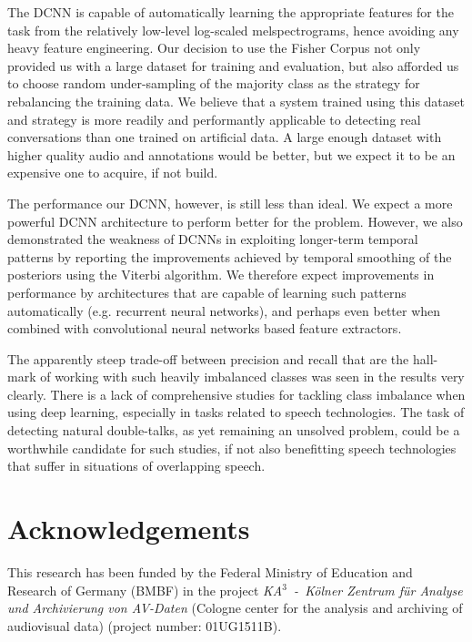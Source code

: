 \documentclass[a4paper]{article}
\begin{document}
The DCNN is capable of automatically learning the appropriate features for the task from the relatively low-level log-scaled melspectrograms, hence avoiding any heavy feature engineering.
Our decision to use the Fisher Corpus not only provided us with a large dataset for training and evaluation,
but also afforded us to choose random under-sampling of the majority class as the strategy for rebalancing the training data.
We believe that a system trained using this dataset and strategy is more readily and performantly applicable to detecting real conversations than one trained on artificial data.
A large enough dataset with higher quality audio and annotations would be better,
but we expect it to be an expensive one to acquire, if not build.

The performance our DCNN, however, is still less than ideal.
We expect a more powerful DCNN architecture to perform better for the problem.
However, we also demonstrated the weakness of DCNNs in exploiting longer-term temporal patterns by reporting the improvements achieved by temporal smoothing of the posteriors using the Viterbi algorithm.
We therefore expect improvements in performance by architectures that are capable of learning such patterns automatically (e.g. recurrent neural networks),
and perhaps even better when combined with convolutional neural networks based feature extractors.

The apparently steep trade-off between precision and recall that are the hall-mark of working with such heavily imbalanced classes was seen in the results very clearly.
There is a lack of comprehensive studies for tackling class imbalance when using deep learning,
especially in tasks related to speech technologies.
The task of detecting natural double-talks, as yet remaining an unsolved problem,
could be a worthwhile candidate for such studies,
if not also benefitting speech technologies that suffer in situations of overlapping speech.


\section{Acknowledgements}
This research has been funded by the Federal Ministry of Education and Research of Germany (BMBF) in the project \textit{KA$^3$~-~K{\"o}lner Zentrum für Analyse und Archivierung von AV-Daten} (Cologne center for the analysis and archiving of audiovisual data) (project number: 01UG1511B).



\end{document}
